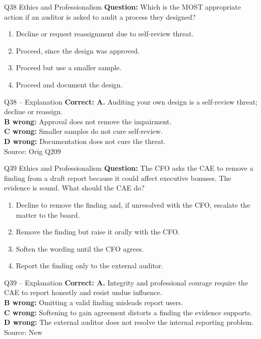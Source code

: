 \documentclass[aspectratio=169,10pt]{beamer}
\begin{document}
\begin{frame}[t]{Q38 \hfill {\scriptsize Ethics and Professionalism}}
	\small
	\textbf{Question:} Which is the MOST appropriate action if an auditor is asked to audit a process they designed?
	\begin{enumerate}[label=\Alph*.,itemsep=1pt,topsep=3pt]
			\item Decline or request reassignment due to self-review threat.
			\item Proceed, since the design was approved.
			\item Proceed but use a smaller sample.
			\item Proceed and document the design.
	\end{enumerate}
\end{frame}

\begin{frame}[t]{Q38 -- Explanation}
	\footnotesize
	\textbf{Correct: A.} Auditing your own design is a self-review threat; decline or reassign. \\[5pt]
\textbf{B wrong:} Approval does not remove the impairment. \\[3pt]
\textbf{C wrong:} Smaller samples do not cure self-review. \\[3pt]
\textbf{D wrong:} Documentation does not cure the threat. \\[3pt]
	\vfill {\tiny Source: Orig Q209}
\end{frame}

\begin{frame}[t]{Q39 \hfill {\scriptsize Ethics and Professionalism}}
	\small
	\textbf{Question:} The CFO asks the CAE to remove a finding from a draft report because it could affect executive bonuses. The evidence is sound. What should the CAE do?
	\begin{enumerate}[label=\Alph*.,itemsep=1pt,topsep=3pt]
			\item Decline to remove the finding and, if unresolved with the CFO, escalate the matter to the board.
			\item Remove the finding but raise it orally with the CFO.
			\item Soften the wording until the CFO agrees.
			\item Report the finding only to the external auditor.
	\end{enumerate}
\end{frame}

\begin{frame}[t]{Q39 -- Explanation}
	\footnotesize
	\textbf{Correct: A.} Integrity and professional courage require the CAE to report honestly and resist undue influence. \\[5pt]
\textbf{B wrong:} Omitting a valid finding misleads report users. \\[3pt]
\textbf{C wrong:} Softening to gain agreement distorts a finding the evidence supports. \\[3pt]
\textbf{D wrong:} The external auditor does not resolve the internal reporting problem. \\[3pt]
	\vfill {\tiny Source: New}
\end{frame}
\end{document}
